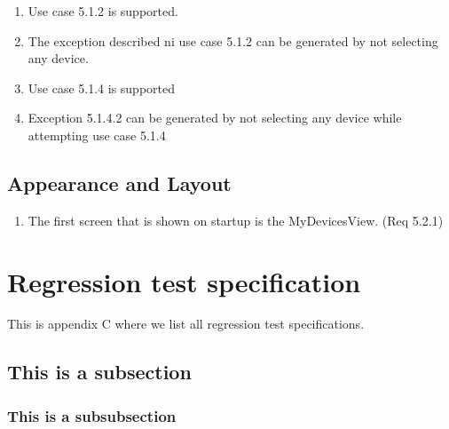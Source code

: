 \documentclass[a4paper]{article}
\newlength{\testlabellength}
\newenvironment{testlist}{\begin{enumerate}[label=\bfseries Test \thesubsection.\arabic* , labelindent=0pt, labelwidth=\testlabellength , leftmargin=2cm]}{\end{enumerate}}
\begin{document}
\begin{appendices}
\begin{testlist}
	\item Use case 5.1.2 is supported.
	\item The exception described ni use case 5.1.2 can be generated by not selecting any device.
	
	\item Use case 5.1.4 is supported
	\item Exception 5.1.4.2 can be generated by not selecting any device while attempting use case 5.1.4
	
\end{testlist}

\subsection{Appearance and Layout}

\begin{testlist}
	\item The first screen that is shown on startup is the MyDevicesView. (Req 5.2.1)
\end{testlist}


\newpage
\section{Regression test specification}
This is appendix C where we list all regression test specifications.

\subsection{This is a subsection}

\subsubsection{This is a subsubsection}
\end{appendices}
\end{document}
